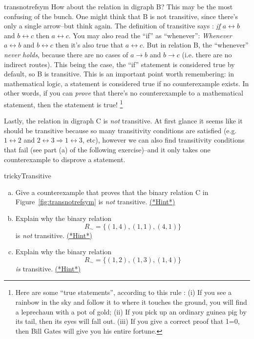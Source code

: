 \begin{example}{transnotrefsym}
How about the relation in digraph B?  This may be the most confusing of the bunch. One might think that B is not transitive, since there's only a single arrow--but think again. The definition of transitive says : \underline{\emph{ if}}  $a \rel b$ and $b \rel c$ then  $a \rel c$.  You may also read the ``if'' as ``whenever'':  \emph{Whenever}  $a \rel b$ and $b \rel c$ then it's also true that $a \rel c$.  But in relation B, the ``whenever'' \emph{never holds}, because there are no cases of $a \rightarrow b$ and $b\rightarrow c$  (i.e. there are no indirect routes).    This being the case, the ``if'' statement is considered true by default, so B is transitive.  This is an important point worth remembering: in mathematical logic, a statement is considered true if no counterexample exists. In other words, if you can \emph{prove} that there's no counterexample to a mathematical statement, then the statement is true! \footnote{Here are some ``true statements'', according to this rule :  (i) If you see a rainbow in the sky and follow it to where it touches the ground, you will find a leprechaun with a pot of gold; (ii) If you pick up an ordinary guinea pig by its tail, then its eyes will fall out. (iii) If you give a correct proof that 1=0, then Bill Gates will give you his entire fortune. }    
 

Lastly, the relation in digraph C is \emph{not} transitive. At first glance it seems like it should be transitive because so many transitivity conditions are satisfied (e.g. $1 \rel 2$ and $2 \rel 3 \Rightarrow 1 \rel 3$, etc), however we can also find transitivity conditions that fail (see part (a) of the following exercise)--and it only takes one counterexample to disprove a statement. 
\end{example}

\begin{exercise}{trickyTransitive}
\begin{enumerate}[(a)]
\item Give a counterexample that proves that the binary relation C in Figure~\ref{fig:transnotrefsym} is \emph{not} transitive. \hyperref[sec:EquivalenceRelations:Hints]{(*Hint*)}
\item
Explain why the binary relation 
\[ R_{\sim} = \{(1,4), (1,1),(4,1) \} \]
is \emph{not} transitive.
\hyperref[sec:EquivalenceRelations:Hints]{(*Hint*)} 
\item
Explain why the binary relation 
\[ R_{\sim} = \{(1,2), (1,3),(1,4) \} \]
\emph{is} transitive.
\hyperref[sec:EquivalenceRelations:Hints]{(*Hint*)}
\end{enumerate}
\end{exercise}

